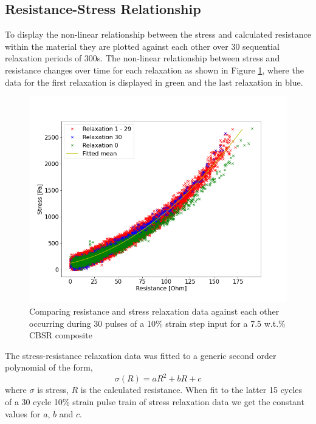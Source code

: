 \subsection{Resistance-Stress Relationship}
To display the non-linear relationship between the stress and calculated resistance within the material they are plotted against each other over 30 sequential relaxation periods of 300s. The non-linear relationship between stress and resistance changes over time for each relaxation as shown in Figure \ref{fig:res_vs_stress_30pulses}, where the data for the first relaxation is displayed in green and the last relaxation in blue.
\begin{figure}[H]
	\centering
	\includegraphics[width=0.7\linewidth]{Figures/relax_res_stress_non_lin_rgby_MAF8_2_7-5_Epin_20mm_v3.png}
	\caption{Comparing resistance and stress relaxation data against each other occurring during 30 pulses of a 10\% strain step input for a 7.5 w.t.\% CBSR composite}
	\label{fig:res_vs_stress_30pulses}
\end{figure}
The stress-resistance relaxation data was fitted to a generic second order polynomial of the form, 
\begin{equation}
	\sigma(R) = aR^2+bR+c
	\label{eqn:poly_res_stress}
\end{equation}
where $\sigma$ is stress, $R$ is the calculated resistance. When fit to the latter 15 cycles of a 30 cycle 10\% strain pulse train of stress relaxation data we get the constant values for $a$, $b$ and $c$.
